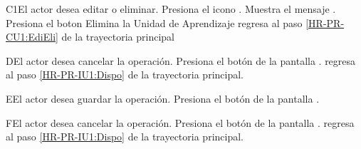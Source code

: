 \begin{UCtrayectoriaA}{C1}{El actor desea editar o eliminar.}
	\UCpaso [\UCactor] Presiona el icono \IUEliminar.
	\UCpaso [\UCsist] Muestra el mensaje .
	\UCpaso [\UCactor] Presiona el boton 
	\UCpaso [\UCsist] Elimina la Unidad de Aprendizaje
	\UCpaso [\UCsist] regresa al paso \ref{HR-PR-CU1:EdiEli} de la trayectoria principal
\end{UCtrayectoriaA} 


\begin{UCtrayectoriaA}{D}{El actor desea cancelar la operación.}
	\UCpaso [\UCactor] Presiona el botón  de la pantalla .
	\UCpaso regresa al paso \ref{HR-PR-IU1:Dispo} de la trayectoria principal.
\end{UCtrayectoriaA}

\begin{UCtrayectoriaA}{E}{El actor desea guardar la operación.}
	\UCpaso [\UCactor] Presiona el botón  de la pantalla .
\end{UCtrayectoriaA} 

\begin{UCtrayectoriaA}{F}{El actor desea cancelar la operación.}
	\UCpaso [\UCactor] Presiona el botón  de la pantalla .
	\UCpaso regresa al paso \ref{HR-PR-IU1:Dispo} de la trayectoria principal.
\end{UCtrayectoriaA}

